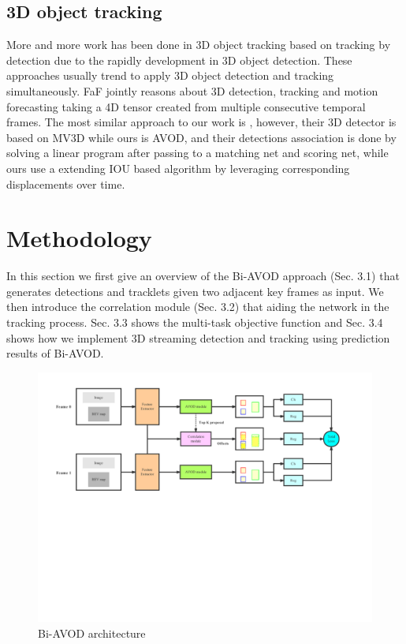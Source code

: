 \documentclass{bmvc2k}
\begin{document}
\subsection{3D object tracking}
More and more work has been done in 3D object tracking based on tracking by detection due to the rapidly development in 3D object detection. These approaches usually trend to apply 3D object detection and tracking simultaneously. FaF \cite{luo2018fast} jointly reasons about 3D detection, tracking and motion forecasting taking a 4D tensor created from multiple consecutive temporal frames. The most similar approach to our work is \cite{frossard2018end}, however, their 3D detector is based on MV3D while ours is AVOD, and their detections association is done by solving a linear program after passing to a matching net and scoring net, while ours use a extending IOU based algorithm \cite{bochinski2018extending} by leveraging corresponding displacements over time.
\section{Methodology}
\label{sec:method}
In this section we first give an overview of the Bi-AVOD approach (Sec. 3.1) that generates detections and tracklets given two adjacent key frames as input. We then introduce the correlation module (Sec. 3.2) that aiding the network in the tracking process. Sec. 3.3 shows the multi-task objective function and Sec. 3.4 shows how we implement 3D streaming detection and tracking using prediction results of Bi-AVOD.

\begin{figure}
	\rule{0pt}{1ex}
	\setlength{\abovecaptionskip}{-1.0cm}
	\begin{center}
		\includegraphics[trim={0cm, 10cm, 3cm, 1cm}, clip, width=\textwidth]{images/Bi-AVOD.pdf}
	\end{center}
	\caption{Bi-AVOD architecture}
	\label{fig:bi-avod}
	\vspace{-0.4cm}
\end{figure}
\end{document}
